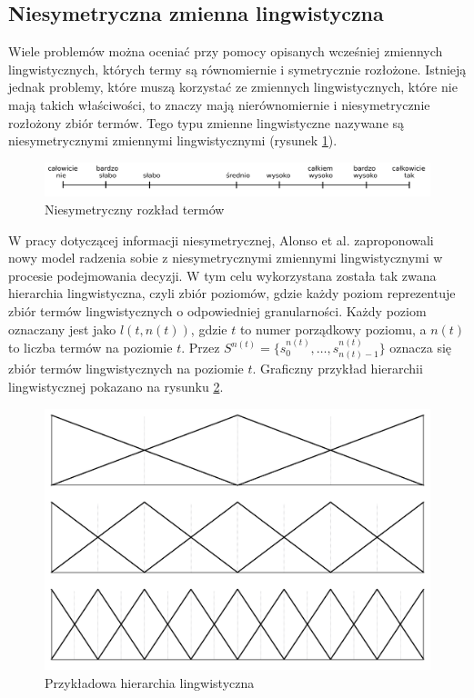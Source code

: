 \subsection{Niesymetryczna zmienna lingwistyczna}
Wiele problemów można oceniać przy pomocy opisanych wcześniej zmiennych
lingwistycznych, których termy są równomiernie i symetrycznie rozłożone.
Istnieją jednak problemy, które muszą korzystać ze zmiennych lingwistycznych,
które nie mają takich właściwości, to znaczy mają nierównomiernie i
niesymetrycznie rozłożony zbiór termów. Tego typu zmienne lingwistyczne nazywane
są niesymetrycznymi zmiennymi lingwistycznymi (rysunek
\ref{fig:niesymetryczna_zmienna}).
\begin{figure}[ht]
  \includegraphics[width=\linewidth]
    {chapters/preferences/niesymetryczna_zmienna}
  \caption{Niesymetryczny rozkład termów}
  \label{fig:niesymetryczna_zmienna}
\end{figure}

W pracy dotyczącej informacji niesymetrycznej, Alonso et al. \cite{Alonso2009}
zaproponowali nowy model radzenia sobie z niesymetrycznymi zmiennymi
lingwistycznymi w procesie podejmowania decyzji. W tym celu wykorzystana została
tak zwana hierarchia lingwistyczna, czyli zbiór poziomów, gdzie każdy poziom
reprezentuje zbiór termów lingwistycznych o odpowiedniej granularności. Każdy
poziom oznaczany jest jako $l(t, n(t))$, gdzie $t$ to numer porządkowy poziomu,
a $n(t)$ to liczba termów na poziomie $t$. Przez $S^{n(t)} = \{s^{n(t)}_0,
\dotsc, s^{n(t)}_{n(t)-1}\}$ oznacza się zbiór termów lingwistycznych na
poziomie $t$. Graficzny przykład hierarchii lingwistycznej pokazano na rysunku
\ref{fig:hierarchia_lingwistyczna}.
\begin{figure}[hb]
  \includegraphics[width=\linewidth]
    {chapters/preferences/hierarchia_lingwistyczna}
  \caption{Przykładowa hierarchia lingwistyczna}
  \label{fig:hierarchia_lingwistyczna}
\end{figure}

